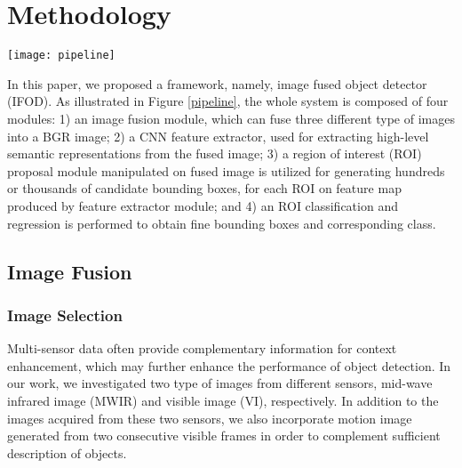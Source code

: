 \documentclass[journal]{IEEEtran}
\begin{document}
\section{Methodology}
\begin{figure*}[htbp]
\texttt{[image: pipeline]}
\caption{The pipeline of proposed object detector framework, which include four main components:1) image fusion, 2) ROI proposal, 3) CNN feature extractor, and 4) ROI classification and regression. }
\centering
\label{pipeline}
\end{figure*}

In this paper, we proposed a framework, namely, image fused object detector (IFOD). As illustrated in Figure \ref{pipeline}, the whole system is composed of four modules: 1) an image fusion module, which can fuse three different type of images into a BGR image; 2) a CNN feature extractor,  used for extracting high-level semantic representations from the fused image; 3) a region of interest (ROI) proposal module manipulated on fused image is utilized for generating hundreds or thousands of candidate bounding boxes, for each ROI on feature map produced by feature extractor module; and 4) an ROI classification and regression is performed to obtain fine bounding boxes and corresponding class.

\subsection{Image Fusion}

\subsubsection{Image Selection}
Multi-sensor data often provide complementary information for context enhancement, which may further enhance the performance of object detection. In our work, we investigated two type of images from different sensors, mid-wave infrared image (MWIR) and visible image (VI), respectively. In addition to the images acquired from these two sensors, we also incorporate motion image generated from two consecutive visible frames in order to complement sufficient description of objects.
\end{document}
